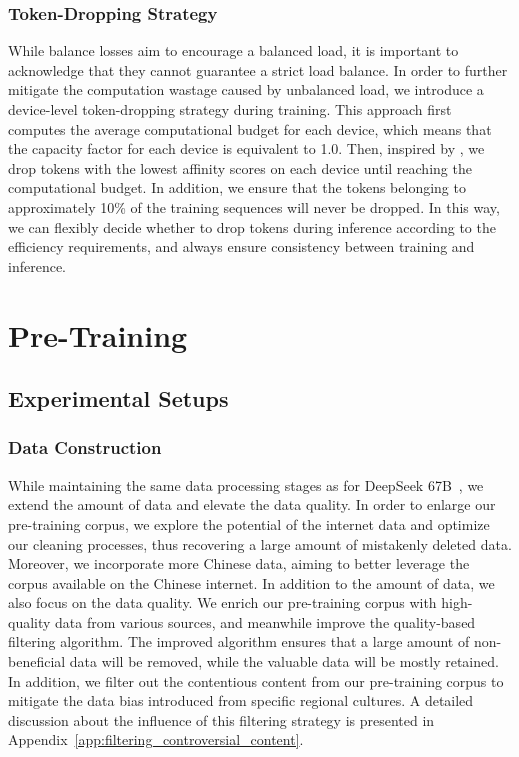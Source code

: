 \documentclass[11pt, a4paper, logo, copyright, nonumbering]{deepseek}
\newcommand{\dsvi}{DeepSeek 67B}
\begin{document}
\begin{CJK*}{UTF8}{gbsn}
\subsubsection{Token-Dropping Strategy}

While balance losses aim to encourage a balanced load, it is important to acknowledge that they cannot guarantee a strict load balance. 
In order to further mitigate the computation wastage caused by unbalanced load, we introduce a device-level token-dropping strategy during training. 
This approach first computes the average computational budget for each device, which means that the capacity factor for each device is equivalent to 1.0. 
Then, inspired by \citet{bpr}, we drop tokens with the lowest affinity scores on each device until reaching the computational budget. 
In addition, we ensure that the tokens belonging to approximately 10\% of the training sequences will never be dropped. 
In this way, we can flexibly decide whether to drop tokens during inference according to the efficiency requirements, and always ensure consistency between training and inference. 

\section{Pre-Training}
\label{sec:pre-training}

\subsection{Experimental Setups}

\subsubsection{Data Construction}

While maintaining the same data processing stages as for \dsvi{}~\citep{deepseek1}, we extend the amount of data and elevate the data quality. 
In order to enlarge our pre-training corpus, we explore the potential of the internet data and optimize our cleaning processes, thus recovering a large amount of mistakenly deleted data. 
Moreover, we incorporate more Chinese data, aiming to better leverage the corpus available on the Chinese internet. 
In addition to the amount of data, we also focus on the data quality. 
We enrich our pre-training corpus with high-quality data from various sources, and meanwhile improve the quality-based filtering algorithm. 
The improved algorithm ensures that a large amount of non-beneficial data will be removed, while the valuable data will be mostly retained. 
In addition, we filter out the contentious content from our pre-training corpus to mitigate the data bias introduced from specific regional cultures. 
A detailed discussion about the influence of this filtering strategy is presented in Appendix~\ref{app:filtering_controversial_content}. 


\end{CJK*}
\end{document}
